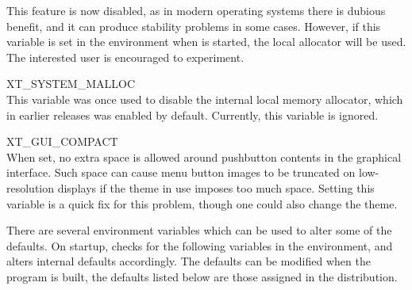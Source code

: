\begin{description}
This feature is now disabled, as in modern operating systems there is
dubious benefit, and it can produce stability problems in some cases. 
However, if this variable is set in the environment when {\WRspice} is
started, the local allocator will be used.  The interested user is
encouraged to experiment.

\item{\et XT\_SYSTEM\_MALLOC}\\
This variable was once used to disable the internal local memory
allocator, which in earlier releases was enabled by default. 
Currently, this variable is ignored.

\item{\et XT\_GUI\_COMPACT}\\
When set, no extra space is allowed around pushbutton contents in the
graphical interface.  Such space can cause menu button images to
be truncated on low-resolution displays if the theme in use imposes
too much space.  Setting this variable is a quick fix for this
problem, though one could also change the theme.
\end{description}

There are several environment variables which can be used to alter
some of the {\WRspice} defaults.  On startup, {\WRspice} checks for the
following variables in the environment, and alters internal defaults
accordingly.  The defaults can be modified when the program is built,
the defaults listed below are those assigned in the distribution.

